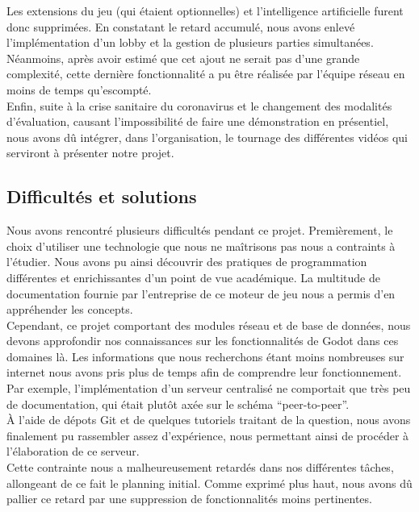 \documentclass[a4paper,11pt]{article}
\begin{document}
Les extensions du jeu (qui étaient optionnelles) et l'intelligence artificielle furent donc supprimées. En constatant le retard accumulé, nous avons enlevé l’implémentation d’un lobby et la gestion de plusieurs parties simultanées.  \\

Néanmoins, après avoir estimé que cet ajout ne serait pas d’une grande complexité, cette dernière fonctionnalité a pu être réalisée par l’équipe réseau en moins de temps qu’escompté. \\

Enfin, suite à la crise sanitaire du coronavirus et le changement des modalités d’évaluation, causant l’impossibilité de faire une démonstration en présentiel, nous avons dû intégrer, dans l’organisation, le tournage des différentes vidéos qui serviront à présenter notre projet. 

\subsection{Difficultés et solutions}

Nous avons rencontré plusieurs difficultés pendant ce projet. Premièrement, le choix d’utiliser une technologie que nous ne maîtrisons pas nous a contraints à l’étudier. Nous avons pu ainsi découvrir des pratiques de programmation différentes et enrichissantes d’un point de vue académique. La multitude de documentation fournie par l’entreprise de ce moteur de jeu nous a permis d’en appréhender les concepts. \\

Cependant, ce projet comportant des modules réseau et de base de données, nous devons approfondir nos connaissances sur les fonctionnalités de Godot dans ces domaines là. Les informations que nous recherchons étant moins nombreuses sur internet nous avons pris plus de temps afin de comprendre leur fonctionnement. Par exemple, l’implémentation d’un serveur centralisé ne comportait que très peu de documentation, qui était plutôt axée sur le schéma “peer-to-peer”. \\

À l’aide de dépots Git et de quelques tutoriels traitant de la question, nous avons finalement pu rassembler assez d’expérience, nous permettant ainsi de procéder à l’élaboration de ce serveur. \\

	Cette contrainte nous a malheureusement retardés dans nos différentes tâches, allongeant de ce fait le planning initial. Comme exprimé plus haut, nous avons dû pallier ce retard par une suppression de fonctionnalités moins pertinentes. \\
\end{document}
